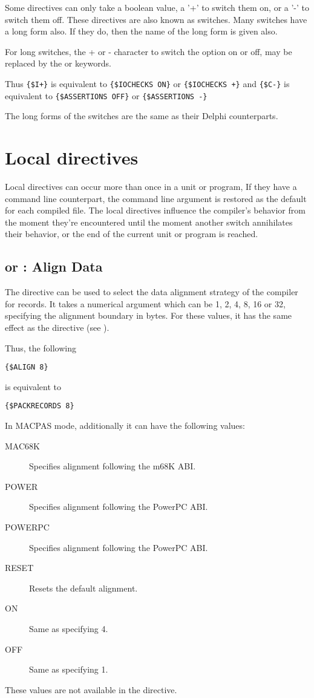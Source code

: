 Some directives can only take a boolean value, a '+' to switch them on,
or a '-' to switch them off. These directives are also known as switches.
Many switches have a long form also. If they do, then the name of the
long form is given also. 

For long switches, the + or - character to switch the option on or off, 
may be replaced by the  or  keywords.

Thus \verb|{$I+}| is equivalent to \verb|{$IOCHECKS ON}| or
\verb|{$IOCHECKS +}| and
\verb|{$C-}| is equivalent to \verb|{$ASSERTIONS OFF}| or
\verb|{$ASSERTIONS -}|

The long forms of the switches are the same as their Delphi
counterparts.



\section{Local directives}
\label{se:LocalSwitch}
Local directives can occur more than once in a unit or program,
If they have a command line counterpart, the command line argument is
restored as the default for each compiled file. The local directives
influence the compiler's behavior from the moment they're encountered
until the moment another switch annihilates their behavior, or the end
of the current unit or program is reached.

\subsection{ or  : Align Data}
\label{se:Align}

The  directive can be used to select the data alignment 
strategy of the compiler for records. It takes a numerical argument
which can be 1, 2, 4, 8, 16 or 32, specifying the alignment boundary 
in bytes. For these values, it has the same effect as the 
 directive (see ).

Thus, the following
\begin{verbatim}
{$ALIGN 8}
\end{verbatim}
is equivalent to 
\begin{verbatim}
{$PACKRECORDS 8}
\end{verbatim}

In MACPAS mode, additionally it can have the following values:
\begin{description}
\item[MAC68K] Specifies alignment following the m68K ABI.
\item[POWER] Specifies alignment following the PowerPC ABI.
\item[POWERPC] Specifies alignment following the PowerPC ABI.
\item[RESET] Resets the default alignment.
\item[ON] Same as specifying 4.
\item[OFF] Same as specifying 1.
\end{description}
These values are not available in the  directive. 

